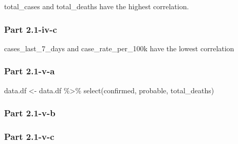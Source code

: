 \documentclass[
]{article}
\newenvironment{Shaded}{\begin{snugshade}}{\end{snugshade}}
\newcommand{\FunctionTok}[1]{\textcolor[rgb]{0.00,0.00,0.00}{#1}}
\newcommand{\NormalTok}[1]{#1}
\newcommand{\OtherTok}[1]{\textcolor[rgb]{0.56,0.35,0.01}{#1}}
\newcommand{\SpecialCharTok}[1]{\textcolor[rgb]{0.00,0.00,0.00}{#1}}
\begin{document}
total\_cases and total\_deaths have the highest correlation.

\hypertarget{part-2.1-iv-c}{%
\subsubsection{Part 2.1-iv-c}\label{part-2.1-iv-c}}

cases\_last\_7\_days and case\_rate\_per\_100k have the lowest
correlation

\hypertarget{part-2.1-v-a}{%
\subsubsection{Part 2.1-v-a}\label{part-2.1-v-a}}

\begin{Shaded}
\begin{Highlighting}[]
\NormalTok{data.df }\OtherTok{\textless{}{-}}\NormalTok{ data.df }\SpecialCharTok{\%\textgreater{}\%} \FunctionTok{select}\NormalTok{(confirmed, probable, total\_deaths)}
\end{Highlighting}
\end{Shaded}

\hypertarget{part-2.1-v-b}{%
\subsubsection{Part 2.1-v-b}\label{part-2.1-v-b}}

\hypertarget{part-2.1-v-c}{%
\subsubsection{Part 2.1-v-c}\label{part-2.1-v-c}}
\end{document}
